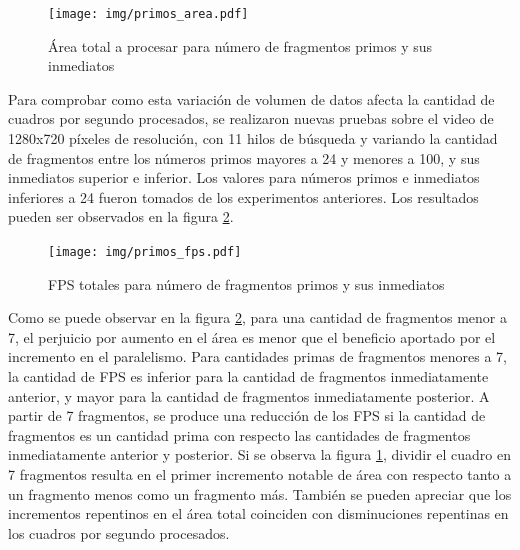 \begin{figure}[h]

	\texttt{[image: img/primos\_area.pdf]}
	\caption{Área total a procesar para número de fragmentos primos y sus inmediatos}
	\label{primosArea}

\end{figure}

Para comprobar como esta variación de volumen de datos afecta la cantidad de
cuadros por segundo procesados, se realizaron nuevas pruebas sobre el video de
1280x720 píxeles de resolución, con 11 hilos de búsqueda y variando la cantidad
de fragmentos entre los números primos mayores a 24 y menores a 100, y sus
inmediatos superior e inferior. Los valores para números primos e inmediatos
inferiores a 24 fueron tomados de los experimentos anteriores. Los resultados
pueden ser observados en la figura \ref{primosFPS}.

\begin{figure}[h]

	\texttt{[image: img/primos\_fps.pdf]}
	\caption{FPS totales para número de fragmentos primos y sus inmediatos}
	\label{primosFPS}

\end{figure}

Como se puede observar en la figura \ref{primosFPS}, para una cantidad de
fragmentos menor a 7, el perjuicio por aumento en el área es menor que el
beneficio aportado por el incremento en el paralelismo. Para cantidades primas
de fragmentos menores a 7, la cantidad de FPS es inferior para la cantidad de
fragmentos inmediatamente anterior, y mayor para la cantidad de fragmentos
inmediatamente posterior. A partir de 7 fragmentos, se produce una reducción de
los FPS si la cantidad de fragmentos es un cantidad prima con respecto las
cantidades de fragmentos inmediatamente anterior y posterior. Si se observa la
figura \ref{primosArea}, dividir el cuadro en 7 fragmentos resulta en el primer
incremento notable de área con respecto tanto a un fragmento menos como un
fragmento más. También se pueden apreciar que los incrementos repentinos en el
área total coinciden con disminuciones repentinas en los cuadros por segundo
procesados.

